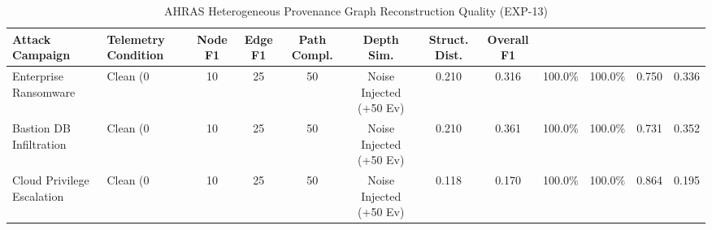 \begin{table}[t]
\centering
\small
\caption{AHRAS Heterogeneous Provenance Graph Reconstruction Quality (EXP-13)}
\label{tab:provenance_reconstruction_eval}
\begin{tabular}{llcccccc}
\toprule
\textbf{Attack Campaign} & \textbf{Telemetry Condition} & \textbf{Node F1} & \textbf{Edge F1} & \textbf{Path Compl.} & \textbf{Depth Sim.} & \textbf{Struct. Dist.} & \textbf{Overall F1} \\
\midrule
Enterprise Ransomware & Clean (0%
 & 10%
 & 25%
 & 50%
 & Noise Injected (+50 Ev) & 0.210 & 0.316 & 100.0\% & 100.0\% & 0.750 & 0.336 \\
\midrule
Bastion DB Infiltration & Clean (0%
 & 10%
 & 25%
 & 50%
 & Noise Injected (+50 Ev) & 0.210 & 0.361 & 100.0\% & 100.0\% & 0.731 & 0.352 \\
\midrule
Cloud Privilege Escalation & Clean (0%
 & 10%
 & 25%
 & 50%
 & Noise Injected (+50 Ev) & 0.118 & 0.170 & 100.0\% & 100.0\% & 0.864 & 0.195 \\
\bottomrule
\end{tabular}
\end{table}

